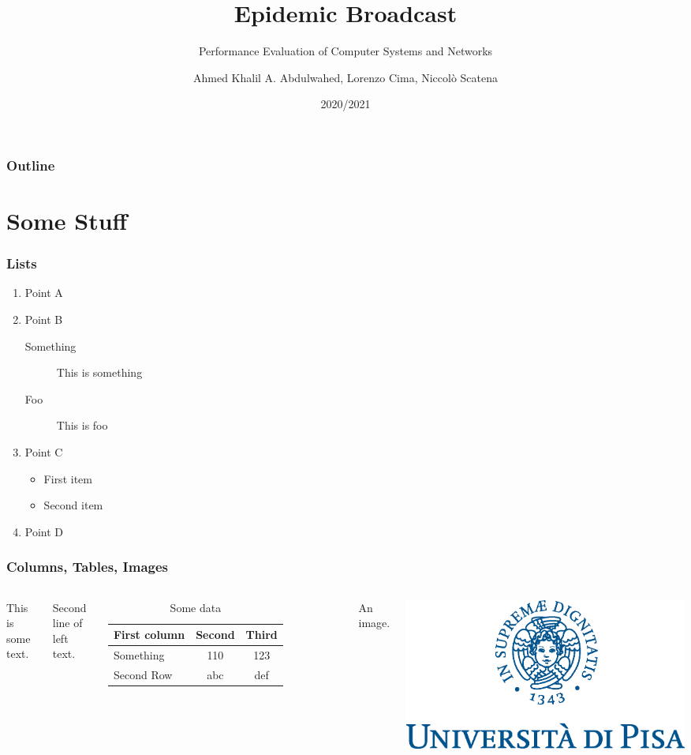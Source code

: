 \documentclass{beamer}
\title{Epidemic Broadcast}
\subtitle{Performance Evaluation of Computer Systems and Networks}
\author{Ahmed Khalil A. Abdulwahed, Lorenzo Cima, Niccolò Scatena}
\institute{University of Pisa}
\date{2020/2021}
\begin{document}
\begin{frame}
	\titlepage{}
\end{frame}

\begin{frame}
	\frametitle{Outline}
	\tableofcontents
\end{frame}

\section{Some Stuff}

\begin{frame}
	\frametitle{Lists}
	\begin{enumerate}
		\item Point A
		\item Point B
		\begin{description}
			\item[Something] This is something
			\item[Foo] This is foo
		\end{description}
		\item Point C
		\begin{itemize}
			\item First item
			\item Second item
		\end{itemize}
		\item Point D
	\end{enumerate}
\end{frame}

\begin{frame}
	\frametitle{Columns, Tables, Images}
	\begin{columns}
		This is some text.

		Second line of left text.

		\begin{table}
			\begin{tabular}{l | c | c}
				First column & Second & Third \\
				\hline \hline
				Something & 110 & 123 \\
				Second Row & abc & def
			\end{tabular}
			\caption{Some data}
		\end{table}
		An image.

		\includegraphics[scale=0.2]{img/marchio_unipi_pant541}
	\end{columns}
\end{frame}
\end{document}
